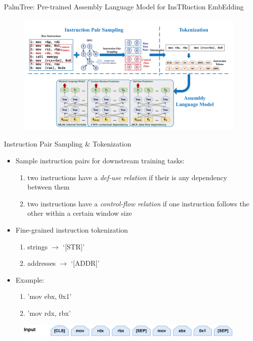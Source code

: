 \documentclass{beamer}
\begin{document}
\begin{frame}{PalmTree: Pre-trained Assembly Language Model for InsTRuction EmbEdding}

	\begin{figure}[h]
	\includegraphics[scale=.225]{images/PalmTree-overview.png}
	\end{figure}
	
\end{frame}

\begin{frame}{Instruction Pair Sampling \& Tokenization}
	
	\begin{itemize}
		\item Sample instruction pairs for downstream training tasks:
		\begin{enumerate}
			\item two instructions have a \textit{def-use relation} if their is any dependency between them %
			\item two instructions have a \textit{control-flow relation} if one instruction follows the other within a certain window size
		\end{enumerate}
		\item Fine-grained instruction tokenization %
		\begin{enumerate}
			\item strings $\rightarrow$ `[STR]'
			\item addresses $\rightarrow$ `[ADDR]'
		\end{enumerate}
		\item Example:
		\begin{enumerate}
			\item 'mov ebx, 0x1'
			\item 'mov rdx, rbx'
		\end{enumerate}
	\end{itemize}

	\begin{figure}[h]
	\includegraphics[scale=.35]{images/instruction-pair-sampling.png}
	\end{figure}
	
\end{frame}
\end{document}
